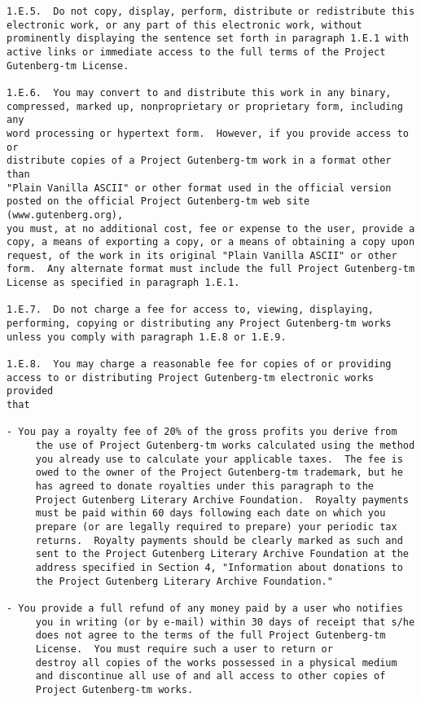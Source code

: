 \documentclass[12pt,oneside]{book}
\begin{document}
\begin{verbatim}
1.E.5.  Do not copy, display, perform, distribute or redistribute this
electronic work, or any part of this electronic work, without
prominently displaying the sentence set forth in paragraph 1.E.1 with
active links or immediate access to the full terms of the Project
Gutenberg-tm License.

1.E.6.  You may convert to and distribute this work in any binary,
compressed, marked up, nonproprietary or proprietary form, including any
word processing or hypertext form.  However, if you provide access to or
distribute copies of a Project Gutenberg-tm work in a format other than
"Plain Vanilla ASCII" or other format used in the official version
posted on the official Project Gutenberg-tm web site (www.gutenberg.org),
you must, at no additional cost, fee or expense to the user, provide a
copy, a means of exporting a copy, or a means of obtaining a copy upon
request, of the work in its original "Plain Vanilla ASCII" or other
form.  Any alternate format must include the full Project Gutenberg-tm
License as specified in paragraph 1.E.1.

1.E.7.  Do not charge a fee for access to, viewing, displaying,
performing, copying or distributing any Project Gutenberg-tm works
unless you comply with paragraph 1.E.8 or 1.E.9.

1.E.8.  You may charge a reasonable fee for copies of or providing
access to or distributing Project Gutenberg-tm electronic works provided
that

- You pay a royalty fee of 20% of the gross profits you derive from
     the use of Project Gutenberg-tm works calculated using the method
     you already use to calculate your applicable taxes.  The fee is
     owed to the owner of the Project Gutenberg-tm trademark, but he
     has agreed to donate royalties under this paragraph to the
     Project Gutenberg Literary Archive Foundation.  Royalty payments
     must be paid within 60 days following each date on which you
     prepare (or are legally required to prepare) your periodic tax
     returns.  Royalty payments should be clearly marked as such and
     sent to the Project Gutenberg Literary Archive Foundation at the
     address specified in Section 4, "Information about donations to
     the Project Gutenberg Literary Archive Foundation."

- You provide a full refund of any money paid by a user who notifies
     you in writing (or by e-mail) within 30 days of receipt that s/he
     does not agree to the terms of the full Project Gutenberg-tm
     License.  You must require such a user to return or
     destroy all copies of the works possessed in a physical medium
     and discontinue all use of and all access to other copies of
     Project Gutenberg-tm works.


\end{verbatim}
\end{document}
